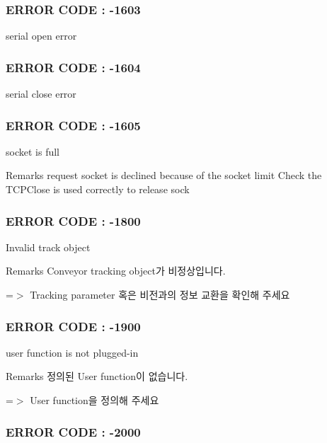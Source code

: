  \subsubsection*{E\-R\-R\-O\-R C\-O\-D\-E \-: -\/1603 }

serial open error



 \subsubsection*{E\-R\-R\-O\-R C\-O\-D\-E \-: -\/1604 }

serial close error



 \subsubsection*{E\-R\-R\-O\-R C\-O\-D\-E \-: -\/1605 }

socket is full \begin{DoxyRemark}{Remarks}
request socket is declined because of the socket limit Check the T\-C\-P\-Close is used correctly to release sock
\end{DoxyRemark}


 \subsubsection*{E\-R\-R\-O\-R C\-O\-D\-E \-: -\/1800 }

Invalid track object \begin{DoxyRemark}{Remarks}
Conveyor tracking object가 비정상입니다. \par
 =$>$ Tracking parameter 혹은 비전과의 정보 교환을 확인해 주세요
\end{DoxyRemark}


 \subsubsection*{E\-R\-R\-O\-R C\-O\-D\-E \-: -\/1900 }

user function is not plugged-\/in \begin{DoxyRemark}{Remarks}
정의된 User function이 없습니다. \par
 =$>$ User function을 정의해 주세요
\end{DoxyRemark}


 \subsubsection*{E\-R\-R\-O\-R C\-O\-D\-E \-: -\/2000 }

